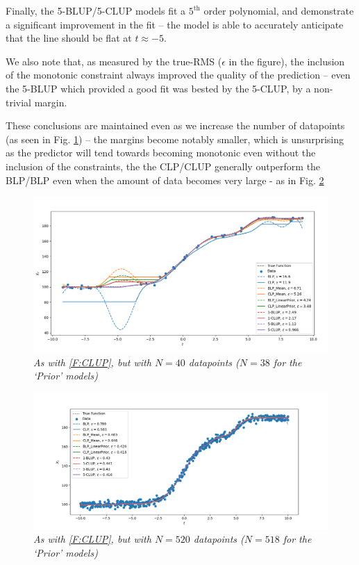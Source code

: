\documentclass[]{article}
\begin{document}
		Finally, the 5-BLUP/5-CLUP models fit a $5^\text{th}$ order polynomial, and demonstrate a significant improvement in the fit -- the model is able to accurately anticipate that the line should be flat at $t\approx-5$.

		We also note that, as measured by the true-RMS ($\epsilon$ in the figure), the inclusion of the monotonic constraint always improved the quality of the prediction -- even the 5-BLUP which provided a good fit was bested by the 5-CLUP, by a non-trivial margin. 

		These conclusions are maintained even as we increase the number of datapoints (as seen in Fig. \ref{F:CLUP2}) -- the margins become notably smaller, which is unsurprising as the predictor will tend towards becoming monotonic even without the inclusion of the constraints, the the CLP/CLUP generally outperform the BLP/BLP even when the amount of data becomes very large - as in Fig. \ref{F:CLUP3}
		\begin{figure}[t]
			\includegraphics[width=\linewidth,keepaspectratio=true]{Figs/CLUP_comparison_moreData.png}
			\caption{\it As with \ref{F:CLUP}, but with $N=40$ datapoints ($N=38$ for the `Prior' models)}\label{F:CLUP2}
		\end{figure}
		\begin{figure}[t]
			\includegraphics[width=\linewidth,keepaspectratio=true]{Figs/CLUP_comparison_moremoreData.png}
			\caption{\it As with \ref{F:CLUP}, but with $N=520$ datapoints ($N=518$ for the `Prior' models)}\label{F:CLUP3}
		\end{figure}
\end{document}
